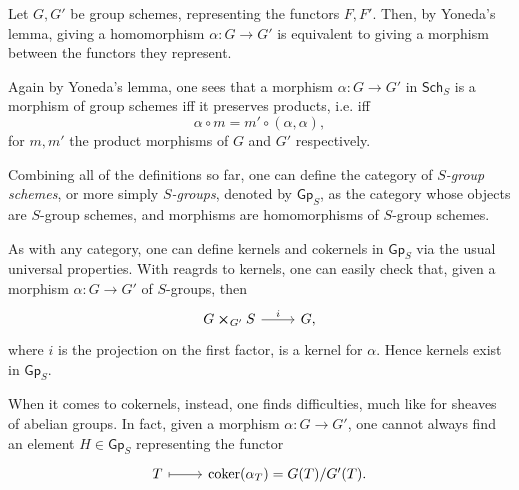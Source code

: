 \documentclass[../Main]{subfiles}
\begin{document}
\begin{rem}
	Let $G, G'$ be group schemes, representing the functors $F,F'$.
	Then, by Yoneda's lemma, giving a homomorphism $\alpha\colon G \to G'$
	is equivalent to giving a morphism between the functors they represent.

	Again by Yoneda's lemma, one sees that a morphism $\alpha\colon G \to G'$
	in $\mathsf{Sch}_{ S }$ is a morphism of group schemes iff
	it preserves products, i.e. iff
	\begin{equation}
		\alpha \circ m = m' \circ (\alpha, \alpha)
	,\end{equation} 
	for $m, m'$ the product morphisms of $G$ and $G'$ respectively.
\end{rem}

\begin{defn}
	Combining all of the definitions so far, one can define the category of
	{\em $S$-group schemes}, or more simply {\em $S$-groups}, denoted by
	$\mathsf{Gp}_S$, as the category whose objects are $S$-group schemes,
	and morphisms are homomorphisms of $S$-group schemes.
\end{defn}


\begin{rem}
	As with any category, one can define kernels and cokernels 
	in $\mathsf{Gp}_S$ via the usual universal properties.
	With reagrds to kernels, one can easily check that, given a morphism
	$\alpha\colon G \to G'$ of $S$-groups, then 
	\begin{equation}
	\begin{tikzcd}
		G \cross_{ G' } S \arrow[r, "i", rightarrow] &
		G,
	\end{tikzcd}
	\end{equation} 
	where $i$ is the projection on the first factor, is a kernel for $\alpha$.
	Hence kernels exist in $\mathsf{Gp}_S$.
	
	When it comes to cokernels, instead, one finds difficulties, much like
	for sheaves of abelian groups.
	In fact, given a morphism $\alpha\colon G \to G'$, one cannot always find an
	element $H \in \mathsf{Gp}_S$ representing the functor
	\begin{equation}
	\begin{tikzcd}
		T \arrow[r, "", mapsto] &
		\coker (\alpha_T) =
		G(T)/G'(T).
	\end{tikzcd}
	\end{equation}
\end{rem}
\end{document}
